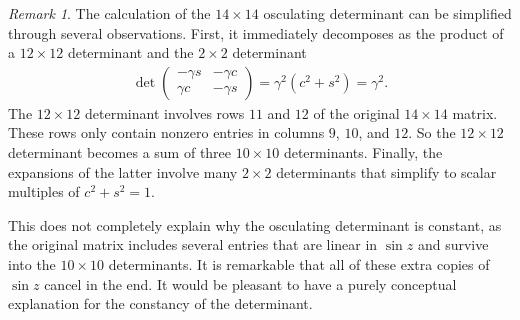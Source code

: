\documentclass[a4paper,10pt,leqno]{article}
\numberwithin{equation}{section}
\theoremstyle{plain}
\theoremstyle{definition}
\theoremstyle{remark}
\newtheorem{rem}[thm]{Remark}
\newcommand{\mat}[1]{\begin{matrix}#1\end{matrix}}
\newcommand{\pmat}[1]{\left(\mat{#1}\right)}
\begin{document}
\begin{rem}
The calculation of the $14 \times 14$ osculating determinant can be simplified through several observations.
First, it immediately decomposes as the product of a $12 \times 12$ determinant and the $2 \times 2$ determinant 
\begin{align} 
\det \pmat{-\gamma s &-\gamma c\\ \gamma c &-\gamma s} = \gamma^2(c^2 + s^2) = \gamma^2.
\end{align}
The $12 \times 12$ determinant involves rows $11$ and $12$ of the original $14 \times 14$ matrix.
These rows only contain nonzero entries in columns $9$, $10$, and $12$.
So the $12 \times 12$ determinant becomes a sum of three $10 \times 10$ determinants.
Finally, the expansions of the latter involve many $2 \times 2$ determinants that simplify to scalar multiples of $c^2 + s^2 = 1$.

This does not completely explain why the osculating determinant is constant, as the original matrix includes several entries that are linear in $\sin z$ and survive into the $10\times 10$ determinants.
It is remarkable that all of these extra copies of $\sin z$ cancel in the end.
It would be pleasant to have a purely conceptual explanation for the constancy of the determinant.
\end{rem}




\end{document}
